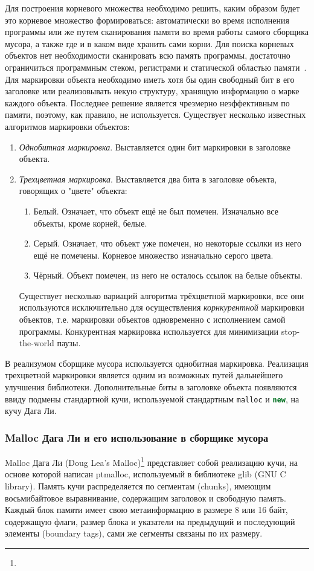 Для построения корневого множества необходимо решить, каким образом будет это корневое множество формироваться:
автоматически во время исполнения программы или же путем сканирования памяти
во время работы самого сборщика мусора, а также где и в каком виде хранить сами корни.
Для поиска корневых объектов нет необходимости сканировать всю память программы, достаточно ограничиться
программным стеком, регистрами и статической областью памяти~\cite{myCoursePaper}.
Для маркировки объекта необходимо иметь хотя бы один свободный бит в его заголовке или реализовывать некую структуру,
хранящую информацию о марке каждого объекта. Последнее решение является чрезмерно неэффективным по памяти, поэтому,
как правило, не используется. Существует несколько известных алгоритмов маркировки объектов:
\begin{enumerate}
\item \textit{Однобитная маркировка}. Выставляется один бит маркировки в заголовке объекта.
\item \textit{Трехцветная маркировка}. Выставляется два бита в заголовке объекта, говорящих о "цвете" объекта:
	\begin{enumerate}
	\item Белый. Означает, что объект ещё не был помечен. Изначально все объекты, кроме корней, белые.
	\item Серый. Означает, что объект уже помечен, но некоторые ссылки из него ещё не помечены. Корневое множество
		изначально серого цвета.
	\item Чёрный. Объект помечен, из него не осталось ссылок на белые объекты.
	\end{enumerate}
Существует несколько вариаций алгоритма трёхцветной маркировки, все они используются
исключительно для осуществления \textit{корнкурентной} маркировки объектов, т.е. маркировки объектов одновременно
с исполнением самой программы. Конкурентная маркировка используется для минимизации stop-the-world паузы.
\end{enumerate}
В реализумом сборщике мусора используется однобитная маркировка.
Реализация трехцветной маркировки является одним из возможных путей дальнейшего улучшения библиотеки.
Дополнительные биты в заголовке объекта появляются ввиду подмены стандартной кучи, используемой стандартным
\lstinline[language= cpp]{malloc} и \lstinline[language= cpp]{new}, на кучу Дага Ли.

\subsubsection{Malloc Дага Ли и его использование в сборщике мусора}
Malloc Дага Ли (Doug Lea's Malloc)\footnote{}
представляет собой реализацию кучи, на основе которой
написан ptmalloc, используемый в библиотеке glib (GNU C library). Память кучи распределяется по сегментам (chunks), имеющим
восьмибайтовое выравнивание, содержащим заголовок и свободную память. Каждый блок памяти имеет свою метаинформацию в размере
8 или 16 байт, содержащую флаги, размер блока и указатели на предыдущий и последующий элементы (boundary tags),
сами же сегменты связаны по их размеру.

